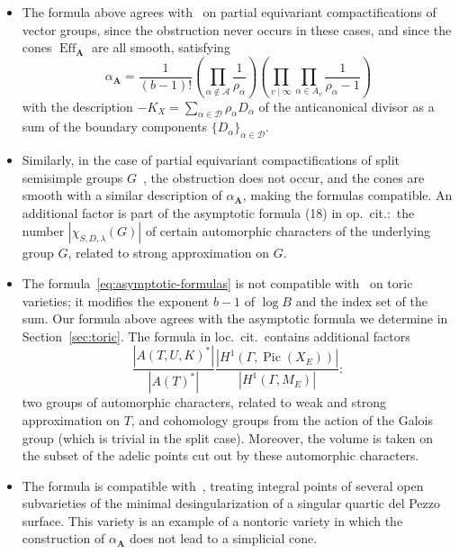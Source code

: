 \documentclass[a4paper, twoside, 10pt]{amsart}
\newcommand{\uA}{{\boldsymbol{A}}}
\newcommand{\cA}{\mathcal{A}}
\newcommand{\cD}{\mathcal{D}}
\DeclareMathOperator{\Eff}{Eff}
\DeclareMathOperator{\Pic}{Pic}
\newcommand{\abs}[1]{\left\lvert#1\right\rvert}
\theoremstyle{definition}
\begin{document}
\begin{itemize}
  \item The formula above agrees with~\cite[Thm.~3.5.6]{MR2999313} on partial equivariant compactifications of vector groups, since the obstruction never occurs in these cases, and since the cones $\Eff_\uA$ are all smooth, satisfying
  \[
    \alpha_\uA=\frac{1}{(b-1)!} \left(\prod_{\alpha\not\in\cA} \frac{1}{\rho_\alpha} \right) \left( \prod_{v\mid\infty} \prod_{\alpha\in A_v} \frac{1}{\rho_\alpha -1} \right)
  \]
  with the description $-K_X=\sum_{\alpha\in\cD} \rho_\alpha D_\alpha$ of the anticanonical divisor as a sum of the boundary components $\{D_\alpha\}_{\alpha\in \cD}$.

  \item Similarly, in the case of partial equivariant compactifications of split semi\-simple groups $G$~\cite{MR3117310}, the obstruction does not occur, and the cones are smooth with a similar description of $\alpha_\uA$, making the formulas compatible. An additional factor is part of the asymptotic formula (18) in op.\ cit.:\ the number $\abs{\chi_{S,D,\lambda}(G)}$ of certain automorphic characters of the underlying group $G$, related to strong approximation on $G$.

  \item The formula~\eqref{eq:asymptotic-formulas} is not compatible with~\cite[Thm.~3.11.5]{arXiv:1006.3345} on toric varieties; it modifies the exponent $b-1$ of $\log B$ and the index set of the sum. Our formula above agrees with the asymptotic formula we determine in Section~\ref{sec:toric}.
  The formula in loc.~cit.\ contains additional factors
  \[
    \frac{\abs{A(T,U,K)^*}}{\abs{A(T)^*}}
    \frac{ \abs{H^1(\Gamma,\Pic(X_E))} }{ \abs{H^1(\Gamma,M_E)} }:
  \]
  two groups of automorphic characters, related to weak and strong approximation on $T$, and cohomology groups from the action of the Galois group (which is trivial in the split case). Moreover, the volume is taken on the subset of the adelic points cut out by these automorphic characters.

  \item The formula is compatible with~\cite{arxiv:2109.06778}, treating integral points of several open subvarieties of the minimal desingularization of a singular quartic del Pezzo surface. This variety is an example of a nontoric variety in which the construction of $\alpha_\uA$ does not lead to a simplicial cone.
\end{itemize}
\end{document}
